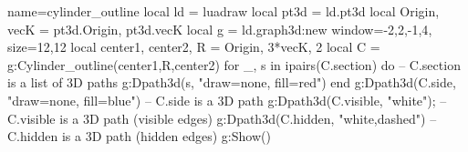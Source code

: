 \documentclass[border=5pt]{standalone}%
\begin{document}
\begin{luadraw}{name=cylinder_outline}
local ld = luadraw
local pt3d = ld.pt3d
local Origin, vecK = pt3d.Origin, pt3d.vecK
local g = ld.graph3d:new{ window={-2,2,-1,4}, size={12,12}}
local center1, center2, R = Origin, 3*vecK, 2
local C = g:Cylinder_outline(center1,R,center2)
for _, s in ipairs(C.section)  do -- C.section is a list of 3D paths
    g:Dpath3d(s, "draw=none, fill=red") 
end
g:Dpath3d(C.side, "draw=none, fill=blue") -- C.side is a 3D path
g:Dpath3d(C.visible, "white"); -- C.visible is a 3D path (visible edges)
g:Dpath3d(C.hidden, "white,dashed") -- C.hidden is a 3D path (hidden edges)
g:Show()
\end{luadraw}
\end{document}
